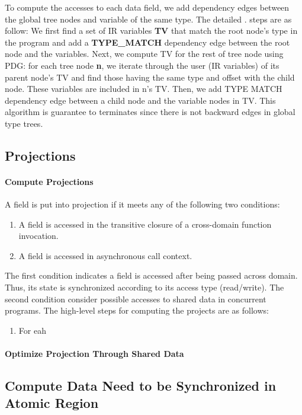 \documentclass[pageno]{jpaper}
\begin{document}
To compute the accesses to each data field, we add dependency edges between the global tree nodes and variable of the same type. The detailed . steps are as follow: We first find a set of IR variables \textbf{TV} that match the root node's type in the program and add a \textbf{TYPE\_MATCH} dependency edge between the root node and the variables. Next, we compute TV for the rest of tree node using PDG: for each tree node \textbf{n}, we iterate through the user (IR variables) of its parent node’s TV and find those having the same type and offset with the child node. These variables are included in n's TV. Then, we add TYPE MATCH dependency edge between a child node and the variable nodes in TV. This algorithm is guarantee to terminates since there is not backward edges in global type trees. 

\subsection{Projections}


\paragraph{Compute Projections}
A field is put into projection if it meets any of the following two conditions:

\begin{enumerate}
  \item A field is accessed in the transitive closure of a cross-domain function invocation.
  \item A field is accessed in asynchronous call context.
\end{enumerate}

The first condition indicates a field is accessed after being passed across domain. Thus, its state is synchronized according to its access type (read/write). The second condition consider possible accesses to shared data in concurrent programs. The high-level steps for computing the projects are as follows:
\begin{enumerate}
  \item For eah 
\end{enumerate}


\paragraph{Optimize Projection Through Shared Data}


\subsection{Compute Data Need to be Synchronized in Atomic Region}
\end{document}
